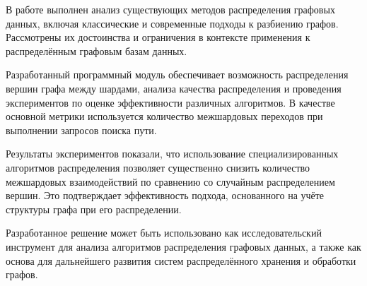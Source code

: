 В работе выполнен анализ существующих методов распределения графовых данных, включая классические и современные подходы к разбиению графов. Рассмотрены их достоинства и ограничения в контексте применения к распределённым графовым базам данных.

Разработанный программный модуль обеспечивает возможность распределения вершин графа между шардами, анализа качества распределения и проведения экспериментов по оценке эффективности различных алгоритмов. В качестве основной метрики используется количество межшардовых переходов при выполнении запросов поиска пути.

Результаты экспериментов показали, что использование специализированных алгоритмов распределения позволяет существенно снизить количество межшардовых взаимодействий по сравнению со случайным распределением вершин. Это подтверждает эффективность подхода, основанного на учёте структуры графа при его распределении.

Разработанное решение может быть использовано как исследовательский инструмент для анализа алгоритмов распределения графовых данных, а также как основа для дальнейшего развития систем распределённого хранения и обработки графов.
